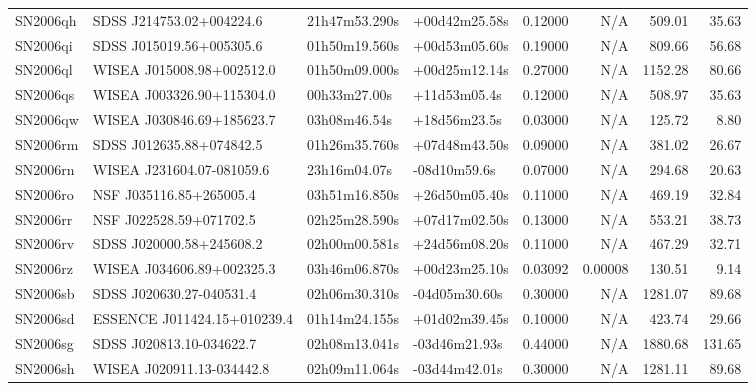 \begin{longtable}{llllrrrr}
SN2006qh         &        SDSS J214753.02+004224.6 &   21h47m53.290s &   +00d42m25.58s &  0.12000 &      N/A &   509.01 &       35.63 \\
SN2006qi         &        SDSS J015019.56+005305.6 &   01h50m19.560s &   +00d53m05.60s &  0.19000 &      N/A &   809.66 &       56.68 \\
SN2006ql         &       WISEA J015008.98+002512.0 &   01h50m09.000s &   +00d25m12.14s &  0.27000 &      N/A &  1152.28 &       80.66 \\
SN2006qs         &       WISEA J003326.90+115304.0 &    00h33m27.00s &    +11d53m05.4s &  0.12000 &      N/A &   508.97 &       35.63 \\
SN2006qw         &       WISEA J030846.69+185623.7 &    03h08m46.54s &    +18d56m23.5s &  0.03000 &      N/A &   125.72 &        8.80 \\
SN2006rm         &        SDSS J012635.88+074842.5 &   01h26m35.760s &   +07d48m43.50s &  0.09000 &      N/A &   381.02 &       26.67 \\
SN2006rn         &       WISEA J231604.07-081059.6 &    23h16m04.07s &    -08d10m59.6s &  0.07000 &      N/A &   294.68 &       20.63 \\
SN2006ro         &         NSF J035116.85+265005.4 &   03h51m16.850s &   +26d50m05.40s &  0.11000 &      N/A &   469.19 &       32.84 \\
SN2006rr         &         NSF J022528.59+071702.5 &   02h25m28.590s &   +07d17m02.50s &  0.13000 &      N/A &   553.21 &       38.73 \\
SN2006rv         &        SDSS J020000.58+245608.2 &   02h00m00.581s &   +24d56m08.20s &  0.11000 &      N/A &   467.29 &       32.71 \\
SN2006rz         &       WISEA J034606.89+002325.3 &   03h46m06.870s &   +00d23m25.10s &  0.03092 &  0.00008 &   130.51 &        9.14 \\
SN2006sb         &        SDSS J020630.27-040531.4 &   02h06m30.310s &   -04d05m30.60s &  0.30000 &      N/A &  1281.07 &       89.68 \\
SN2006sd         &     ESSENCE J011424.15+010239.4 &   01h14m24.155s &   +01d02m39.45s &  0.10000 &      N/A &   423.74 &       29.66 \\
SN2006sg         &        SDSS J020813.10-034622.7 &   02h08m13.041s &   -03d46m21.93s &  0.44000 &      N/A &  1880.68 &      131.65 \\
SN2006sh         &       WISEA J020911.13-034442.8 &   02h09m11.064s &   -03d44m42.01s &  0.30000 &      N/A &  1281.11 &       89.68 \\

\end{longtable}
